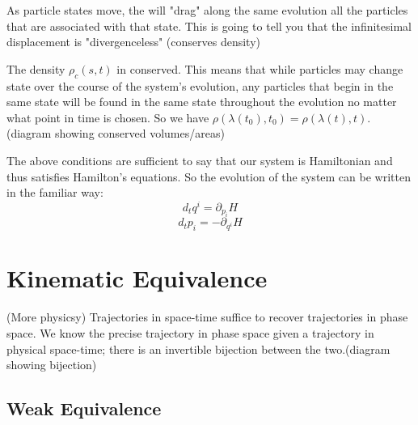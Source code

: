 \documentclass{article}
\begin{document}
	
As particle states move, the will "drag" along the same evolution all the particles that are associated with that state. This is going to tell you that the infinitesimal displacement is "divergenceless" (conserves density)

\begin{prop}
	The density $\rho_c(s,t)$ in conserved. This means that while particles may change state over the course of the system's evolution, any particles that begin in the same state will be found in the same state throughout the evolution no matter what point in time is chosen. So we have $\rho(\lambda(t_0),t_0) = \rho(\lambda(t),t)$. (diagram showing conserved volumes/areas)
\end{prop}

\begin{prop}
	The above conditions are sufficient to say that our system is Hamiltonian and thus satisfies Hamilton's equations. So the evolution of the system can be written in the familiar way:
	$$d_tq^i = \partial_{p_i}H$$
	$$d_tp_i = -\partial_{q^i}H$$
\end{prop} 
	

\section{Kinematic Equivalence}

\begin{assump}
	(More physicsy) Trajectories in space-time suffice to recover trajectories in phase space. We know the precise trajectory in phase space given a trajectory in physical space-time; there is an invertible bijection between the two.(diagram showing bijection)
\end{assump}

\subsection{Weak Equivalence}
\end{document}
